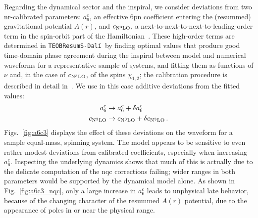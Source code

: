 \documentclass[prd,amssymb,amsmath,amsfonts,nofootinbib,reprint,showpacs,longbibliography]{revtex4-1}
\def\TEOBResumSDali{\texttt{TEOBResumS-Dalí}}
\def\c3{c_{\rm{N}^3\rm{LO}}}
\begin{document}
Regarding the dynamical sector and the inspiral, we consider deviations from two
\ac{nr}-calibrated parameters: $a_6^c$, an effective 6\ac{pn} coefficient entering the (resummed) gravitational
potential $A(r)$, and $c_{\rm{N}^3\rm{LO}}$, a next-to-next-to-next-to-leading-order term in the spin-orbit
part of the Hamiltonian~\cite{Damour:2014sva,Nagar:2023zxh,Nagar:2024oyk}. These high-order terms are
determined in \TEOBResumSDali~by finding optimal values that produce good time-domain phase agreement
during the inspiral between model and numerical waveforms for a representative sample of systems,
and fitting them as functions of $\nu$ and, in the case of $\c3$, of the spins $\chi_{1,2}$;
the calibration procedure is described in detail in~\cite{Nagar:2024oyk}.
We use in this case additive deviations from the fitted values:
\begin{subequations}
\begin{align}
a_6^c &\rightarrow a_6^c + \delta a_6^c \\
\c3 &\rightarrow \c3 + \delta \c3 \, .
\end{align}
\end{subequations}
Figs.~\ref{fig:a6c3} displays the effect of these deviations on the waveform for a sample equal-mass, spinning system.
The model appears to be sensitive to even rather modest deviations from calibrated coefficients, especially
when increasing $a_6^c$. Inspecting the underlying dynamics shows that much of this is actually due to
the delicate computation of the \ac{nqc} corrections failing; wider ranges in both parameters would be
supported by the dynamical model alone. As shown in Fig.~\ref{fig:a6c3_nqc}, only a large increase in $a_6^c$
leads to unphysical late behavior, because of the changing character of the resummed $A(r)$ potential, due to
the appearance of poles in or near the physical range.
\end{document}
